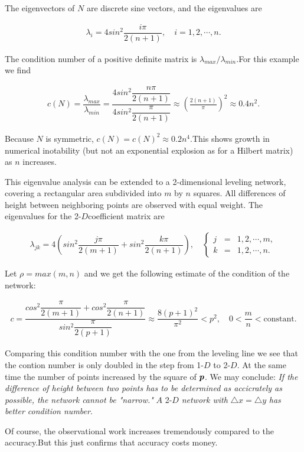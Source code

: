 \begin{flushleft}
	The eigenvectors of $N$ are discrete sine vectors, and the eigenvalues are
\end{flushleft}

\begin{align}
\lambda_{i}=4sin^{2}\dfrac{i\pi}{2(n+1)}, \quad  i=1,2,\cdots,n. 
\end{align}

\begin{flushleft}
	The condition number of a positive definite matrix is $ \lambda_{max}/\lambda_{min} $.For this example we find
\end{flushleft}
\begin{align*}
c(N)=\dfrac{\lambda_{max}}{\lambda_{min}}=\dfrac{4sin^{2}\dfrac{n\pi}{2(n+1)}}{4sin^{2}\dfrac{\pi}{2(n+1)}}\approx(\frac{2(n+1)}{\pi})^{2}\approx0.4n^{2}.
\end{align*}

\begin{flushleft}
	Because $N$ is symmetric, $ c(N)=c(N)^{2}\approx0.2n^{4} $.This shows growth in numerical inotability (but not an exponential explosion as for a Hilbert matrix) as $n$ increases.
\end{flushleft}

This eigenvalue analysis can be extended to a 2-dimensional leveling network, covering a rectangular area subdivided into $m$ by $n$ squares. All differences of height between neighboring points are observed with equal weight. The eigenvalues for the 2-$D $coefficient matrix are

\begin{align*}
\lambda_{jk}=4(sin^{2}\dfrac{j\pi}{2(m+1)}+sin^{2}\dfrac{k\pi}{2(n+1)}), \quad
 \left\{
\begin{aligned}
j & = & 1,2,\cdots,m, \\
k & = & 1,2,\cdots,n. 
\end{aligned}
\right.
\end{align*}
\begin{flushleft}
	Let $ \rho=max(m,n) $ and we get the following estimate of the condition of the network:
\end{flushleft}
\begin{align*}
c=\dfrac{cos^{2}\dfrac{\pi}{2(m+1)}+cos^{2}\dfrac{\pi}{2(n+1)}}{sin^{2}\dfrac{\pi}{2(p+1)}}\approx\dfrac{8(p+1)^{2}}{\pi^{2}}<p^{2}, \quad 0<\dfrac{m}{n}<\text{constant}.
\end{align*}
\begin{flushleft}
	Comparing this condition number with the one from the leveling line we see that the contion number is only doubled in the step from 1-$D$ to 2-$D$. At the same time the number of points increased by the square of $\textit{\textbf{p}}$. We may conclude: \textit{If the difference of height between two points has to be determined as accicrately as possible, the network cannot be "narrow."} $A$ 2-$D$ \textit{network with} $ \bigtriangleup x = \bigtriangleup y$ \textit{has better condition number}. 
\end{flushleft}

Of course, the observational work increases tremendously compared to the accuracy.But this just confirms that accuracy costs money.    